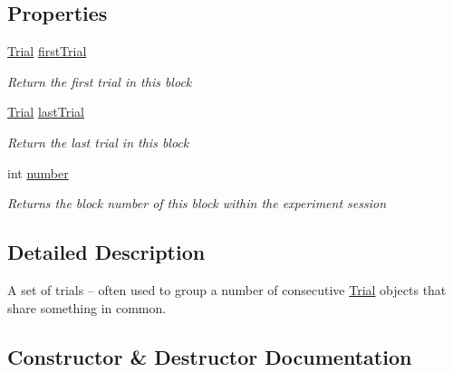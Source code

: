 \subsection*{Properties}
\begin{DoxyCompactItemize}
\item 
\hyperlink{class_exp_mngr_1_1_trial}{Trial} \hyperlink{class_exp_mngr_1_1_block_abd34f0a4dea70e728d8b441ba688e450}{first\+Trial}
\begin{DoxyCompactList}\small\item\em Return the first trial in this block \end{DoxyCompactList}\item 
\hyperlink{class_exp_mngr_1_1_trial}{Trial} \hyperlink{class_exp_mngr_1_1_block_aca2953db07804d8835904a0cbe5138d3}{last\+Trial}
\begin{DoxyCompactList}\small\item\em Return the last trial in this block \end{DoxyCompactList}\item 
int \hyperlink{class_exp_mngr_1_1_block_a310d6c36e6955060d29d22b56440b16d}{number}
\begin{DoxyCompactList}\small\item\em Returns the block number of this block within the experiment session \end{DoxyCompactList}\end{DoxyCompactItemize}


\subsection{Detailed Description}
A set of trials – often used to group a number of consecutive \hyperlink{class_exp_mngr_1_1_trial}{Trial} objects that share something in common. 



\subsection{Constructor \& Destructor Documentation}
\mbox{\label{class_exp_mngr_1_1_block_a88b6169c31950691fc310274673953e8}} 
